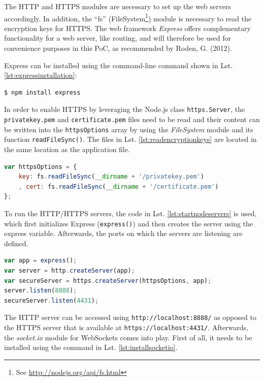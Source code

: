 The HTTP and HTTPS modules are necessary to set up the web servers accordingly. 
In addition, the “fs” (FileSystem\footnote{See \url{ http://nodejs.org/api/fs.html}}) module is necessary to read the encryption keys for HTTPS. The web framework \textit{Express} offers complementary functionality for a web server, like routing, 
and will therefore be used for convenience purposes in this PoC, as recommended by Roden, G. (2012). 

Express can be installed using the command-line command shown in Lst. \ref{lst:expressinstallation}:\\

\begin{lstlisting}[language=javascript,
caption={Installing Express via command-line},
label=lst:expressinstallation,
morekeywords={npm}]
$ npm install express 
\end{lstlisting}%

In order to enable HTTPS by leveraging the Node.js class \texttt{https.Server}, the \texttt{privatekey.pem} and \texttt{certificate.pem} files need to be read and their content can be written into the \texttt{httpsOptions} array by using the \textit{FileSystem} module and its function \texttt{readFileSync()}. The files in Lst. \ref{lst:readencryptionkeys} are located in the same location as the application file.

\begin{lstlisting}[language=javascript,caption={Reading encryption keys},label=lst:readencryptionkeys]
var httpsOptions = {
    key: fs.readFileSync(__dirname + '/privatekey.pem')
    , cert: fs.readFileSync(__dirname + '/certificate.pem')
};
\end{lstlisting}

To run the HTTP/HTTPS servers, the code in Lst. \ref{lst:startnodeservers} is used, which first
initializes Express (\texttt{express()}) and then creates the server using the express variable.
Afterwards, the ports on which the servers are listening are defined.

\begin{lstlisting}[language=javascript,caption={Starting servers in Node.js},label=lst:startnodeservers]
var app = express();
var server = http.createServer(app);
var secureServer = https.createServer(httpsOptions, app);
server.listen(8888);
secureServer.listen(4431);
\end{lstlisting}

The HTTP server can be accessed using \texttt{http://localhost:8888/} as opposed to the
HTTPS server that is available at \texttt{https://localhost:4431/}. Afterwards, the
\textit{socket.io} module for WebSockets comes into play. First of all, it needs to be
installed using the command in Lst. \ref{lst:installsocketio}.

